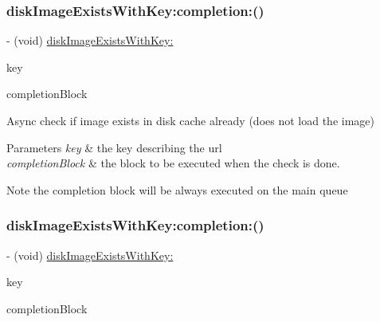 \subsubsection{\texorpdfstring{disk\+Image\+Exists\+With\+Key\+:completion\+:()}{diskImageExistsWithKey:completion:()}\hspace{0.1cm}{\footnotesize\ttfamily [1/3]}}
{\footnotesize\ttfamily -\/ (void) \mbox{\hyperlink{interface_s_d_image_cache_a67feea7b5568f427dfcf4f380abc1ba7}{disk\+Image\+Exists\+With\+Key\+:}} \begin{DoxyParamCaption}\item[{(N\+S\+String $\ast$)}]{key }\item[{completion:(S\+D\+Web\+Image\+Check\+Cache\+Completion\+Block)}]{completion\+Block }\end{DoxyParamCaption}}

Async check if image exists in disk cache already (does not load the image)


\begin{DoxyParams}{Parameters}
{\em key} & the key describing the url \\
\hline
{\em completion\+Block} & the block to be executed when the check is done. \\
\hline
\end{DoxyParams}
\begin{DoxyNote}{Note}
the completion block will be always executed on the main queue 
\end{DoxyNote}
\mbox{\label{interface_s_d_image_cache_a2baefc1300fcd3c57a25b5326dda8834}} 
\subsubsection{\texorpdfstring{disk\+Image\+Exists\+With\+Key\+:completion\+:()}{diskImageExistsWithKey:completion:()}\hspace{0.1cm}{\footnotesize\ttfamily [2/3]}}
{\footnotesize\ttfamily -\/ (void) \mbox{\hyperlink{interface_s_d_image_cache_a67feea7b5568f427dfcf4f380abc1ba7}{disk\+Image\+Exists\+With\+Key\+:}} \begin{DoxyParamCaption}\item[{(N\+S\+String $\ast$)}]{key }\item[{completion:(S\+D\+Web\+Image\+Check\+Cache\+Completion\+Block)}]{completion\+Block }\end{DoxyParamCaption}}

